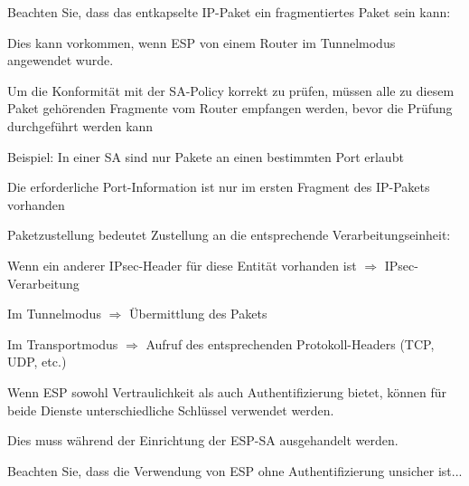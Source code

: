 \documentclass[a4paper]{article}
\begin{document}
\begin{multicols}{3}
\begin{itemize*}
            \item Beachten Sie, dass das entkapselte IP-Paket ein fragmentiertes Paket sein kann:
            \begin{itemize*}
                  \item Dies kann vorkommen, wenn ESP von einem Router im Tunnelmodus angewendet wurde.
                  \item Um die Konformität mit der SA-Policy korrekt zu prüfen, müssen alle zu diesem Paket gehörenden Fragmente vom Router empfangen werden, bevor die Prüfung durchgeführt werden kann
                  \item Beispiel: In einer SA sind nur Pakete an einen bestimmten Port erlaubt
                  \begin{itemize*}
                        \item Die erforderliche Port-Information ist nur im ersten Fragment des IP-Pakets vorhanden
                  \end{itemize*}
            \end{itemize*}
            \item Paketzustellung bedeutet Zustellung an die entsprechende Verarbeitungseinheit:
            \begin{itemize*}
                  \item Wenn ein anderer IPsec-Header für diese Entität vorhanden ist $\Rightarrow$ IPsec-Verarbeitung
                  \item Im Tunnelmodus $\Rightarrow$ Übermittlung des Pakets
                  \item Im Transportmodus $\Rightarrow$ Aufruf des entsprechenden Protokoll-Headers (TCP, UDP, etc.)
            \end{itemize*}
            \item Wenn ESP sowohl Vertraulichkeit als auch Authentifizierung bietet, können für beide Dienste unterschiedliche Schlüssel verwendet werden.
            \begin{itemize*}
                  \item Dies muss während der Einrichtung der ESP-SA ausgehandelt werden.
            \end{itemize*}
            \item Beachten Sie, dass die Verwendung von ESP ohne Authentifizierung unsicher ist...

\end{itemize*}
\end{multicols}
\end{document}
